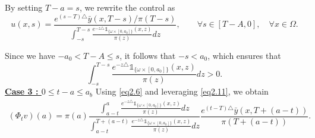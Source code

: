 \documentclass[10pt,a4paper]{amsart}
\makeatletter
\renewenvironment{proof}[1][\proofname]{\par
  \pushQED{\qed}%
  \normalfont \topsep6\p@\@plus6\p@\relax
  \trivlist
  \item[\hskip\labelsep
        \itshape
    #1\ \ref{#1}.]\ignorespaces
}{%
  \popQED\endtrivlist\@endpefalse
}
\makeatother
\begin{document}
\begin{proof}[of Proposition \ref{pr2.3}]
By setting \( T-a = s \), we rewrite the control as  
\begin{equation}\label{eq2.11}
u(x,s) = \dfrac{e^{(s-T)\triangle} \bar{y}(x,T-s) / \pi(T-s)}{\displaystyle\int_{-s}^{T-s} \frac{e^{-z\triangle} \mathds{1}_{\lbrace\omega\times[0,a_0]\rbrace}(x,z)}{\pi(z)} dz}, \qquad \forall s\in [T-A,0],\quad \forall x\in \Omega.
\end{equation}  

Since we have \( -a_0 < T-A \leq s \), it follows that \( -s < a_0 \), which ensures that  
\begin{equation*}
\int_{-s}^{T-s} \frac{e^{-z\triangle} \mathds{1}_{\lbrace\omega\times[0,a_0]\rbrace}(x,z)}{\pi(z)} dz > 0.
\end{equation*}  
 \underline{\bf{Case 3 : $0\leq t-a\leq  a_b$}} 
Using \eqref{eq2.6} and leveraging \eqref{eq2.11}, we obtain  
\begin{align}\label{eq2.12}
(\Phi_t v)(a) = \pi(a) \dfrac{\displaystyle\int_{a-t}^{a} \frac{e^{-z\triangle} \mathds{1}_{\lbrace\omega\times[0,a_0]\rbrace}(x,z)}{\pi(z)} dz}{\displaystyle\int_{a-t}^{T+(a-t)} \frac{e^{-z\triangle} \mathds{1}_{\lbrace\omega\times[0,a_0]\rbrace}(x,z)}{\pi(z)} dz} \dfrac{e^{(t-T)\triangle} \bar{y}(x,T+(a-t))}{\pi(T+(a-t))}.
\end{align}  


\end{proof}
\end{document}
